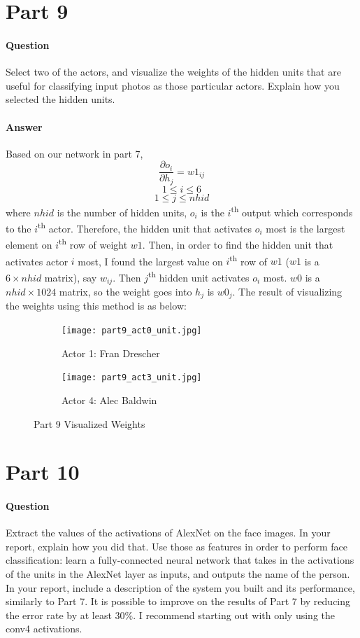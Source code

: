 \documentclass[11pt,twoside]{article}
\begin{document}
\clearpage

\section*{Part 9}
\paragraph{Question}
Select two of the actors, and visualize the weights of the hidden units that are useful for classifying input photos as those particular actors. Explain how you selected the hidden units.

\paragraph{Answer}
Based on our network in part 7,
\[\frac{\partial o_i}{\partial h_j} = w1_{ij}\]
\[1 \leq i \leq 6\]
\[1 \leq j \leq nhid\]
where $nhid$ is the number of hidden units, $o_i$ is the $i$\textsuperscript{th} output which corresponds to the $i$\textsuperscript{th} actor. Therefore, the hidden unit that activates $o_i$ most is the largest element on $i$\textsuperscript{th} row of weight $w1$. Then, in order to find the hidden unit that activates actor $i$ most, I found the largest value on $i$\textsuperscript{th} row of $w1$ ($w1$ is a $6 \times nhid$ matrix), say $w_{ij}$. Then $j$\textsuperscript{th} hidden unit activates $o_i$ most. $w0$ is a $nhid \times 1024$ matrix, so the weight goes into $h_j$ is $w0_{j}$. The result of visualizing the weights using this method is as below:

\begin{figure}[h]
	\centering
	\begin{subfigure}[h]{0.4\textwidth}
	\centering
	\texttt{[image: part9\_act0\_unit.jpg]}
	\caption*{Actor 1: Fran Drescher}
	\end{subfigure}
	\begin{subfigure}[h]{0.4\textwidth}
	\centering
	\texttt{[image: part9\_act3\_unit.jpg]}
	\caption*{Actor 4: Alec Baldwin}
	\end{subfigure}
\caption*{Part 9 Visualized Weights}
\end{figure}

\clearpage

\section*{Part 10}
\paragraph{Question}
Extract the values of the activations of AlexNet on the face images. In your report, explain how you did that. Use those as features in order to perform face classification: learn a fully-connected neural network that takes in the activations of the units in the AlexNet layer as inputs, and outputs the name of the person. In your report, include a description of the system you built and its performance, similarly to Part 7. It is possible to improve on the results of Part 7 by reducing the error rate by at least 30\%. I recommend starting out with only using the conv4 activations.
\end{document}
